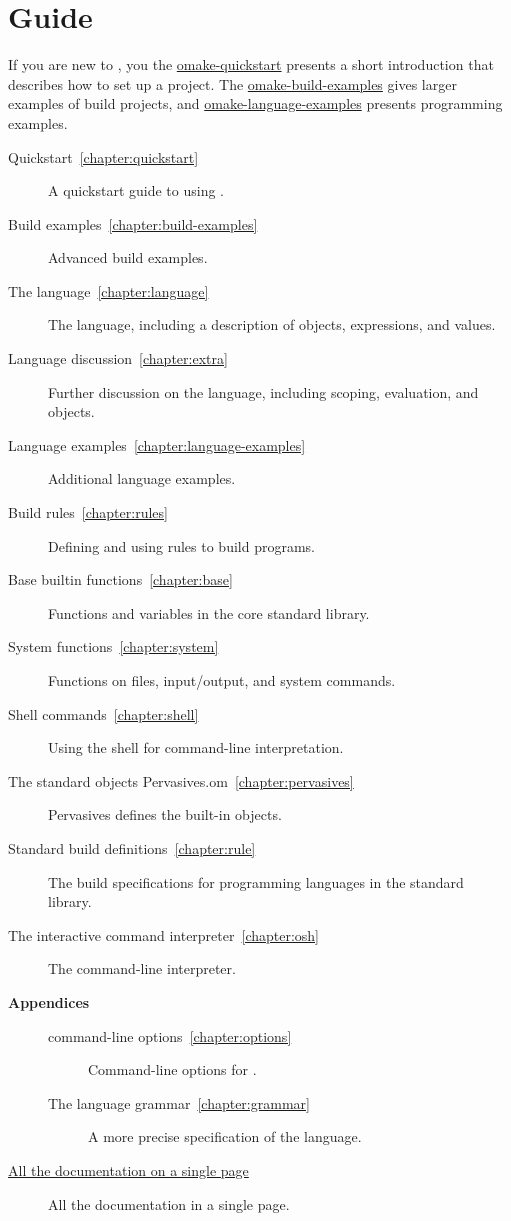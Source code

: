 %
\chapter{Guide}
\label{chapter:omake}
\label{section:guide}

If you are new to \OMake{}, you the \href{omake-quickstart.html}{omake-quickstart} presents a short
introduction that describes how to set up a project.  The
\href{omake-build-examples.html}{omake-build-examples} gives larger examples of build projects, and
\href{omake-language-examples.html}{omake-language-examples} presents programming examples.

\begin{description}
\item[Quickstart~\ref{chapter:quickstart}]
%
   A quickstart guide to using .
\item[Build examples~\ref{chapter:build-examples}]
%
   Advanced build examples.
\item[The \OMake{} language~\ref{chapter:language}]
%
   The  language, including a description of objects, expressions, and values.
\item[Language discussion~\ref{chapter:extra}]
%
   Further discussion on the language, including scoping, evaluation, and objects.
\item[Language examples~\ref{chapter:language-examples}]
%
   Additional language examples.
\item[Build rules~\ref{chapter:rules}]
%
   Defining and using rules to build programs.
\item[Base builtin functions~\ref{chapter:base}]
%
   Functions and variables in the core standard library.
\item[System functions~\ref{chapter:system}]
%
   Functions on files, input/output, and system commands.
\item[Shell commands~\ref{chapter:shell}]
%
   Using the  shell for command-line interpretation.
\item[The standard objects Pervasives.om~\ref{chapter:pervasives}]
%
   Pervasives defines the built-in objects.
\item[Standard build definitions~\ref{chapter:rule}]
%
   The build specifications for programming languages in the \OMake{} standard library.
\item[The interactive command interpreter~\ref{chapter:osh}]
%
   The  command-line interpreter.
\item[\textbf{Appendices}]
\begin{description}
\item[\OMake{} command-line options~\ref{chapter:options}]
%
   Command-line options for .
%
\item[The \OMake{} language grammar~\ref{chapter:grammar}]
%
   A more precise specification of the \OMake{} language.
\end{description}
\item[\href{omake-doc.html}{All the documentation on a single page}]
%
   All the \OMake{} documentation in a single page.
\end{description}

